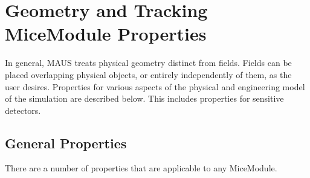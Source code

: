 \chapter{Geometry and Tracking MiceModule Properties}
In general, MAUS treats physical geometry distinct from fields. Fields can be placed overlapping physical
objects, or entirely independently of them, as the user desires. Properties for various aspects of the
physical and engineering model of the simulation are described below. This includes properties for
sensitive detectors.

\section{General Properties}
There are a number of properties that are applicable to any MiceModule.

